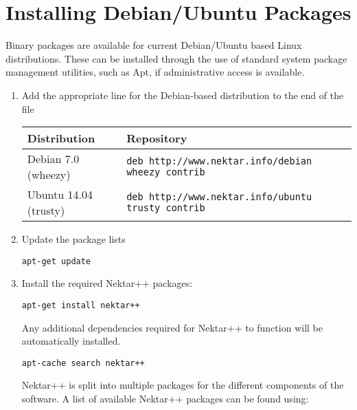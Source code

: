 \section{Installing Debian/Ubuntu Packages}
\label{s:installation:debian}
Binary packages are available for current Debian/Ubuntu based Linux
distributions. These can be installed through the use of standard system package
management utilities, such as Apt, if administrative access is
available.

\begin{enumerate}
	\item Add the appropriate line for the Debian-based distribution to the end of
	the file 
	
	{\small
	\begin{tabular}{ll}
	\toprule
	Distribution & Repository \\
	\midrule
	Debian 7.0 (wheezy) & 
	   \texttt{deb http://www.nektar.info/debian wheezy contrib} \\
	Ubuntu 14.04 (trusty) & 
	   \texttt{deb http://www.nektar.info/ubuntu trusty contrib}\\
	\bottomrule
	\end{tabular}
	}
	\item Update the package lists
	\begin{lstlisting}[style=BashInputStyle]
	apt-get update
	\end{lstlisting}
	\item Install the required Nektar++ packages:
	\begin{lstlisting}[style=BashInputStyle]
	apt-get install nektar++
	\end{lstlisting}
	Any additional dependencies required for Nektar++ to function will be
	automatically installed.
	
    \newsavebox\installationDebTip
    \begin{lrbox}{\installationDebTip}\begin{minipage}{0.8\linewidth}
    \begin{lstlisting}[style=BashInputStyle]
    apt-cache search nektar++
    \end{lstlisting}
    \end{minipage}
    \end{lrbox}
	
	\begin{tipbox}
	Nektar++ is split into multiple packages for the different components of the
	software. A list of available Nektar++ packages can be found using:
	\noindent\usebox\installationDebTip
	\end{tipbox}
\end{enumerate}


